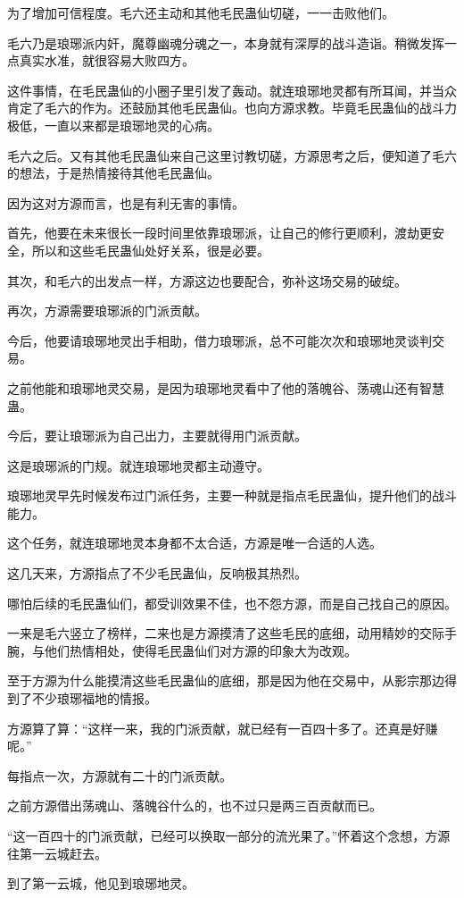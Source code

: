 \begin{this_body}
为了增加可信程度。毛六还主动和其他毛民蛊仙切磋，一一击败他们。

毛六乃是琅琊派内奸，魔尊幽魂分魂之一，本身就有深厚的战斗造诣。稍微发挥一点真实水准，就很容易大败四方。

这件事情，在毛民蛊仙的小圈子里引发了轰动。就连琅琊地灵都有所耳闻，并当众肯定了毛六的作为。还鼓励其他毛民蛊仙。也向方源求教。毕竟毛民蛊仙的战斗力极低，一直以来都是琅琊地灵的心病。

毛六之后。又有其他毛民蛊仙来自己这里讨教切磋，方源思考之后，便知道了毛六的想法，于是热情接待其他毛民蛊仙。

因为这对方源而言，也是有利无害的事情。

首先，他要在未来很长一段时间里依靠琅琊派，让自己的修行更顺利，渡劫更安全，所以和这些毛民蛊仙处好关系，很是必要。

其次，和毛六的出发点一样，方源这边也要配合，弥补这场交易的破绽。

再次，方源需要琅琊派的门派贡献。

今后，他要请琅琊地灵出手相助，借力琅琊派，总不可能次次和琅琊地灵谈判交易。

之前他能和琅琊地灵交易，是因为琅琊地灵看中了他的落魄谷、荡魂山还有智慧蛊。

今后，要让琅琊派为自己出力，主要就得用门派贡献。

这是琅琊派的门规。就连琅琊地灵都主动遵守。

琅琊地灵早先时候发布过门派任务，主要一种就是指点毛民蛊仙，提升他们的战斗能力。

这个任务，就连琅琊地灵本身都不太合适，方源是唯一合适的人选。

这几天来，方源指点了不少毛民蛊仙，反响极其热烈。

哪怕后续的毛民蛊仙们，都受训效果不佳，也不怨方源，而是自己找自己的原因。

一来是毛六竖立了榜样，二来也是方源摸清了这些毛民的底细，动用精妙的交际手腕，与他们热情相处，使得毛民蛊仙们对方源的印象大为改观。

至于方源为什么能摸清这些毛民蛊仙的底细，那是因为他在交易中，从影宗那边得到了不少琅琊福地的情报。

方源算了算：“这样一来，我的门派贡献，就已经有一百四十多了。还真是好赚呢。”

每指点一次，方源就有二十的门派贡献。

之前方源借出荡魂山、落魄谷什么的，也不过只是两三百贡献而已。

“这一百四十的门派贡献，已经可以换取一部分的流光果了。”怀着这个念想，方源往第一云城赶去。

到了第一云城，他见到琅琊地灵。


\end{this_body}
